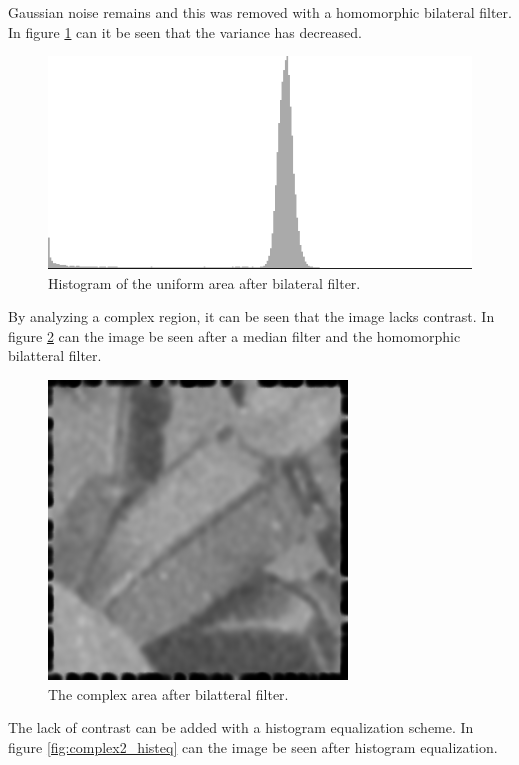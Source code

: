 Gaussian noise remains and this was removed with a homomorphic bilateral filter.
In figure \ref{fig:hist2_bilateral} can it be seen that the variance has decreased.

\begin{figure}[H]
\centering
\includegraphics[width = \histogramWidth]{graphics/hist2_after_bilatteral.png}
\caption{Histogram of the uniform area after bilateral filter.}
\label{fig:hist2_bilateral}
\end{figure}

By analyzing a complex region, it can be seen that the image lacks contrast.
In figure \ref{fig:complex2_bilatteral} can the image be seen after a median filter and the homomorphic bilatteral filter.

\begin{figure}[H]
\centering
\includegraphics[width = \cutOutWidth]{graphics/complex2_bilatteral.png}
\caption{The complex area after bilatteral filter.}
\label{fig:complex2_bilatteral}
\end{figure}

The lack of contrast can be added with a histogram equalization scheme.
In figure \ref{fig:complex2_histeq} can the image be seen after histogram equalization.

